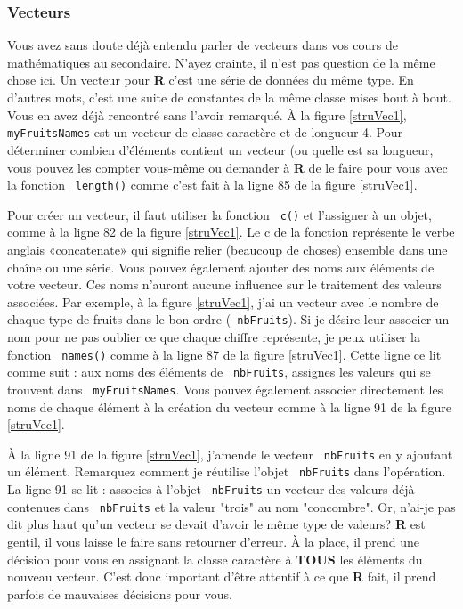 \documentclass[10.5pt,a4paper]{article}
\newcommand{\rcode}[1]{\texttt{\color{rstudio} #1}}
\begin{document}
    \subsubsection{Vecteurs}
    Vous avez sans doute déjà entendu parler de vecteurs dans vos cours de mathématiques au secondaire. N'ayez crainte, il n'est pas question de la même chose ici. Un vecteur pour \textbf{R} c'est une série de données du même type. En d'autres mots, c'est une suite de constantes de la même classe mises bout à bout. Vous en avez déjà rencontré sans l'avoir remarqué. À la figure \ref{struVec1}, \rcode{myFruitsNames} est un vecteur de classe caractère et de longueur 4. Pour déterminer combien d'éléments contient un vecteur (ou quelle est sa longueur, vous pouvez les compter vous-même ou demander à \textbf{R} de le faire pour vous avec la fonction \rcode{length()} comme c'est fait à la ligne 85 de la figure \ref{struVec1}. 
    
    Pour créer un vecteur, il faut utiliser la fonction \rcode{c()} et l'assigner à un objet, comme à la ligne 82 de la figure \ref{struVec1}. Le c de la fonction représente le verbe anglais «concatenate» qui signifie relier (beaucoup de choses) ensemble dans une chaîne ou une série. Vous pouvez également ajouter des noms aux éléments de votre vecteur. Ces noms n'auront aucune influence sur le traitement des valeurs associées. Par exemple, à la figure \ref{struVec1}, j'ai un vecteur avec le nombre de chaque type de fruits dans le bon ordre (\rcode{nbFruits}). Si je désire leur associer un nom pour ne pas oublier ce que chaque chiffre représente, je peux utiliser la fonction \rcode{names()} comme à la ligne 87 de la figure \ref{struVec1}. Cette ligne ce lit comme suit : aux noms des éléments de \rcode{nbFruits}, assignes les valeurs qui se trouvent dans \rcode{myFruitsNames}. Vous pouvez également associer directement les noms de chaque élément à la création du vecteur comme à la ligne 91 de la figure \ref{struVec1}. 
    
    À la ligne 91 de la figure \ref{struVec1}, j'amende le vecteur \rcode{nbFruits} en y ajoutant un élément. Remarquez comment je réutilise l'objet \rcode{nbFruits} dans l'opération. La ligne 91 se lit : associes à l'objet \rcode{nbFruits} un vecteur des valeurs déjà contenues dans \rcode{nbFruits} et la valeur "trois" au nom "concombre". Or, n'ai-je pas dit plus haut qu'un vecteur se devait d'avoir le même type de valeurs? \textbf{R} est gentil, il vous laisse le faire sans retourner d'erreur. À la place, il prend une décision pour vous en assignant la classe caractère à \textbf{TOUS} les éléments du nouveau vecteur. C'est donc important d'être attentif à ce que \textbf{R} fait, il prend parfois de mauvaises décisions pour vous. 
    
\end{document}
